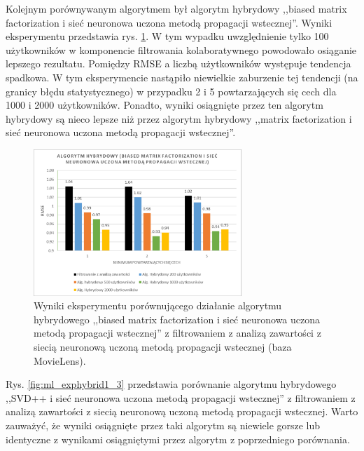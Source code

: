\documentclass[twoside]{iisthesis}
\begin{document}
		Kolejnym porównywanym algorytmem był algorytm hybrydowy ,,biased matrix factorization i sieć neuronowa uczona metodą propagacji wstecznej''. Wyniki eksperymentu przedstawia rys. \ref{fig:ml_exphybrid1_2}. 
		W tym wypadku uwzględnienie tylko 100 użytkowników w komponencie filtrowania kolaboratywnego powodowało osiąganie lepszego rezultatu. Pomiędzy RMSE a liczbą użytkowników występuje tendencja spadkowa. W tym eksperymencie nastąpiło niewielkie zaburzenie tej tendencji (na granicy błędu statystycznego) w przypadku 2 i 5 powtarzających się cech dla 1000 i 2000 użytkowników. Ponadto, wyniki osiągnięte przez ten algorytm hybrydowy są nieco lepsze niż przez algorytm hybrydowy ,,matrix factorization i sieć neuronowa uczona metodą propagacji wstecznej''.
	
		\begin{figure}
			\centering
			\includegraphics[width=0.7\textwidth]{ml_exphybrid1_2}			
			\caption{Wyniki eksperymentu porównującego działanie algorytmu hybrydowego ,,biased matrix factorization i sieć neuronowa uczona metodą propagacji wstecznej'' z filtrowaniem z analizą zawartości z siecią neuronową uczoną metodą propagacji wstecznej (baza MovieLens).}
			\label{fig:ml_exphybrid1_2}
		\end{figure}
		
		Rys. \ref{fig:ml_exphybrid1_3} przedstawia porównanie algorytmu hybrydowego ,,SVD++ i sieć neuronowa uczona metodą propagacji wstecznej'' z filtrowaniem z analizą zawartości z siecią neuronową uczoną metodą propagacji wstecznej. Warto zauważyć, że wyniki osiągnięte przez taki algorytm są niewiele gorsze lub identyczne z wynikami osiągniętymi przez algorytm z poprzedniego porównania. 
\end{document}
